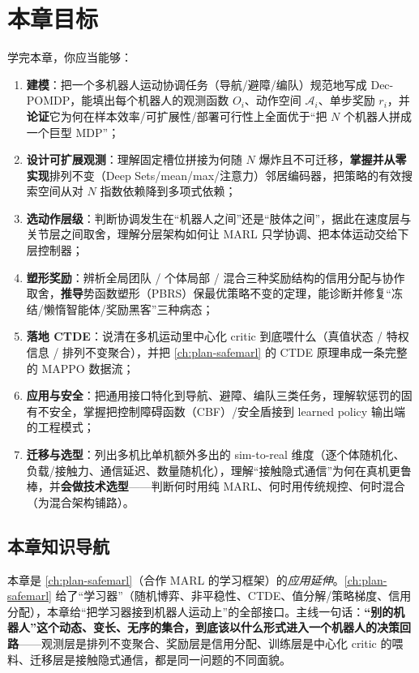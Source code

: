 \section*{本章目标}
学完本章，你应当能够：
\begin{enumerate}
  \item \textbf{建模}：把一个多机器人运动协调任务（导航/避障/编队）规范地写成 Dec-POMDP，能填出每个机器人的观测函数 $O_i$、动作空间 $\mathcal{A}_i$、单步奖励 $r_i$，并\textbf{论证}它为何在样本效率/可扩展性/部署可行性上全面优于“把 $N$ 个机器人拼成一个巨型 MDP”；
  \item \textbf{设计可扩展观测}：理解固定槽位拼接为何随 $N$ 爆炸且不可迁移，\textbf{掌握并从零实现}排列不变（Deep Sets/mean/max/注意力）邻居编码器，把策略的有效搜索空间从对 $N$ 指数依赖降到多项式依赖；
  \item \textbf{选动作层级}：判断协调发生在“机器人之间”还是“肢体之间”，据此在速度层与关节层之间取舍，理解分层架构如何让 MARL 只学协调、把本体运动交给下层控制器；
  \item \textbf{塑形奖励}：辨析全局团队 / 个体局部 / 混合三种奖励结构的信用分配与协作取舍，\textbf{推导}势函数塑形（PBRS）保最优策略不变的定理，能诊断并修复“冻结/懒惰智能体/奖励黑客”三种病态；
  \item \textbf{落地 CTDE}：说清在多机运动里中心化 critic 到底喂什么（真值状态 / 特权信息 / 排列不变聚合），并把 \cref{ch:plan-safemarl} 的 CTDE 原理串成一条完整的 MAPPO 数据流；
  \item \textbf{应用与安全}：把通用接口特化到导航、避障、编队三类任务，理解软惩罚的固有不安全，掌握把控制障碍函数（CBF）/安全盾接到 learned policy 输出端的工程模式；
  \item \textbf{迁移与选型}：列出多机比单机额外多出的 sim-to-real 维度（逐个体随机化、负载/接触力、通信延迟、数量随机化），理解“接触隐式通信”为何在真机更鲁棒，并\textbf{会做技术选型}——判断何时用纯 MARL、何时用传统规控、何时混合（为混合架构铺路）。
\end{enumerate}

\subsection*{本章知识导航}
本章是 \cref{ch:plan-safemarl}（合作 MARL 的学习框架）的\emph{应用延伸}。\cref{ch:plan-safemarl} 给了“学习器”（随机博弈、非平稳性、CTDE、值分解/策略梯度、信用分配），本章给“把学习器接到机器人运动上”的全部接口。主线一句话：\textbf{“别的机器人”这个动态、变长、无序的集合，到底该以什么形式进入一个机器人的决策回路}——观测层是排列不变聚合、奖励层是信用分配、训练层是中心化 critic 的喂料、迁移层是接触隐式通信，都是同一问题的不同面貌。

